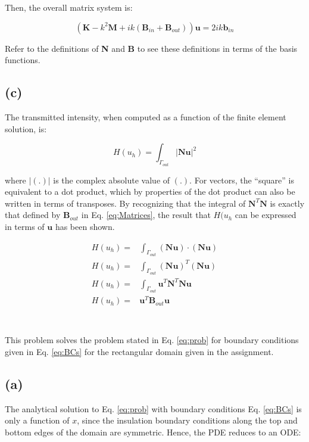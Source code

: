 \documentclass[10pt]{article}
\newcommand{\beq}{\begin{equation}}
\newcommand{\eeq}{\end{equation}}
\newcommand{\beqa}{\begin{equation}\begin{aligned}}
\newcommand{\eeqa}{\end{aligned}\end{equation}}
\begin{document}
Then, the overall matrix system is:

\beq
\left(\textbf{K}-k^2\textbf{M}+ik(\textbf{B}_{in}+\textbf{B}_{out})\right)\textbf{u}=2ik\textbf{b}_{in}
\eeq

Refer to the definitions of \textbf{N} and \textbf{B} to see these definitions in terms of the basis functions.

\subsection{(c)}

The transmitted intensity, when computed as a function of the finite element solution, is:

\beq
H(u_h)=\int_{\Gamma_{out}}|\textbf{N}\textbf{u}|^2
\eeq

where \(|(.)|\) is the complex absolute value of \((.)\). For vectors, the ``square'' is equivalent to a dot product, which by properties of the dot product can also be written in terms of transposes. By recognizing that the integral of \(\textbf{N}^T\textbf{N}\) is exactly that defined by \(\textbf{B}_{out}\) in Eq. \eqref{eq:Matrices}, the result that \(H(u_h\) can be expressed in terms of \(\textbf{u}\) has been shown.

\beqa
H(u_h)=&\int_{\Gamma_{out}}(\textbf{N}\textbf{u})\cdot(\textbf{N}\textbf{u})\\
H(u_h)=&\int_{\Gamma_{out}}(\textbf{N}\textbf{u})^T(\textbf{N}\textbf{u})\\
H(u_h)=&\int_{\Gamma_{out}}\textbf{u}^T\textbf{N}^T\textbf{N}\textbf{u}\\
H(u_h)=&\textbf{u}^T\textbf{B}_{out}\textbf{u}\\
\eeqa



\section{}

This problem solves the problem stated in Eq. \eqref{eq:prob} for boundary conditions given in Eq. \eqref{eq:BCs} for the rectangular domain given in the assignment.

\subsection{(a)}

The analytical solution to Eq. \eqref{eq:prob} with boundary conditions Eq. \eqref{eq:BCs} is only a function of \(x\), since the insulation boundary conditions along the top and bottom edges of the domain are symmetric. Hence, the PDE reduces to an ODE:
\end{document}
